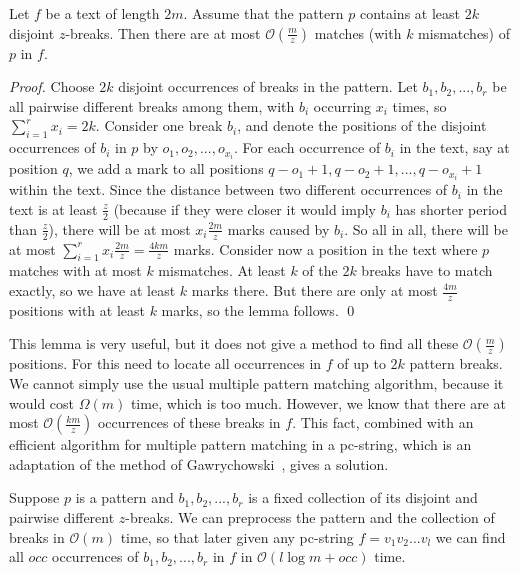 \documentclass[runningheads]{llncs}
\begin{document}
\begin{lemma}\label{lemma:sparsify_matches}
Let $f$ be a text of length $2m$. Assume that the pattern $p$ contains at least $2k$ disjoint $z$-breaks. Then there are at most $\mathcal{O}(\frac{m}{z})$ matches (with $k$ mismatches) of $p$ in $f$.
\end{lemma}

\begin{proof}
Choose $2k$ disjoint occurrences of breaks in the pattern. Let $b_1, b_2, ..., b_r$ be all pairwise different breaks among them, with $b_i$ occurring $x_i$ times, so $\sum_{i=1}^{r}x_i=2k$. Consider one break $b_i$, and denote the positions of the disjoint occurrences of $b_i$ in $p$ by $o_1, o_2, ..., o_{x_i}$. For each occurrence of $b_i$ in the text, say at position $q$, we add a mark to all positions $q-o_{1}+1, q-o_2+1, \ldots, q-o_{x_i}+1$ within the text. Since the distance between two different occurrences of $b_i$ in the text is at least $\frac{z}{2}$ (because if they were closer it would imply $b_i$ has shorter period than $\frac{z}{2}$), there will be at most $x_i\frac{2m}{z}$ marks caused by $b_i$. So all in all, there will be at most $\sum_{i=1}^{r}x_i\frac{2m}{z}=\frac{4km}{z}$ marks. Consider now a position in the text where $p$ matches with at most $k$ mismatches. At least $k$ of the $2k$ breaks have to match exactly, so we have at least $k$ marks there. But there are only at most $\frac{4m}{z}$ positions with at least $k$ marks, so the lemma follows.
\qed
\end{proof}


This lemma is very useful, but it does not give a method to find all these $\mathcal{O}(\frac{m}{z})$ positions. For this need to locate all occurrences in $f$ of up to $2k$ pattern breaks. We cannot simply use the usual multiple pattern matching algorithm, because it would cost $\Omega(m)$ time, which is too much. However, we know that there are at most $\mathcal{O}(\frac{km}{z})$ occurrences of these breaks in $f$. This fact, combined with an efficient algorithm for multiple pattern matching in a pc-string, which is an adaptation
of the method of Gawrychowski~\cite{GawrychowskiMultipleLZW}, gives a solution.


\begin{lemma}\label{lemma:break_matching}
Suppose $p$ is a pattern and $b_1, b_2, ..., b_r$ is a fixed collection of its disjoint and pairwise different $z$-breaks. We can preprocess the pattern and the collection of breaks
in $\mathcal{O}(m)$ time, so that later given any pc-string $f=v_1v_2...v_l$ we can find all $occ$ occurrences of $b_1, b_2, ..., b_r$ in $f$ in $\mathcal{O}(l\log m+occ)$ time.
\end{lemma}
\end{document}
